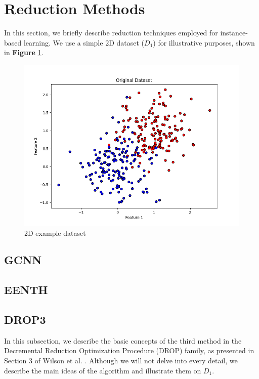 
\section{Reduction Methods}
In this section, we briefly describe reduction techniques employed for instance-based learning. We use a simple 2D dataset ($D_1$) for illustrative purposes, shown in \textbf{Figure} \ref{fig:2dDatasetReduction}.
\begin{figure}[ht]
	\centering
	\includegraphics[width=\textwidth]{figures/2dDataset} %
	\caption{2D example dataset}
	\label{fig:2dDatasetReduction}
\end{figure}

\subsection{GCNN}
\subsection{EENTH}
\subsection{DROP3}
In this subsection, we describe the basic concepts of the third method in the Decremental Reduction Optimization Procedure (DROP) family, as presented in Section 3 of Wilson et al. \cite{wilson2000reduction}. Although we will not delve into every detail, we describe the main ideas of the algorithm and illustrate them on $D_1$.

